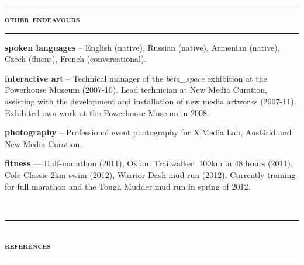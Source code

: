 \documentclass[a4paper,12pt]{article}
\begin{document}
\begin{spacing}{0.95}
\begin{minipage}[t]{95.5mm}
	\vspace{4mm}
	\rule[1mm]{\linewidth}{1mm}
	{\Large\textsc{\textbf{other endeavours}}}\\
	\vspace{2.5mm}%
	\rule[1mm]{\linewidth}{1mm}
	
	{\small
	\textbf{\textsf{spoken languages}} -- English (native), Russian (native), Armenian (native), Czech (fluent), French (conversational).
	
	\vspace{3mm}
	\textbf{\textsf{interactive art}} -- Technical manager of the \emph{beta\_space} exhibition at the Powerhouse Museum (2007-10). Lead technician at New Media Curation, assisting with the development and installation of  new media artworks (2007-11). Exhibited own work at the Powerhouse Museum in 2008.
	
	\vspace{3mm}
	\textbf{\textsf{photography}} -- Professional event photography for X|Media Lab, AusGrid and New Media Curation.
	
	\vspace{3mm}
	\textbf{\textsf{fitness}} --- Half-marathon (2011), Oxfam Trailwalker: 100km in 48 hours (2011), Cole Classic 2km swim (2012), Warrior Dash mud run (2012). Currently training for full marathon and the Tough Mudder mud run in spring of 2012.%
	}%
\end{minipage}\\
\vspace{1mm}

\rule[1mm]{\linewidth}{1mm}\\
{\Large\textsc{\textbf{references}}}\\
\rule[1mm]{\linewidth}{1mm}


\end{spacing}
\end{document}
